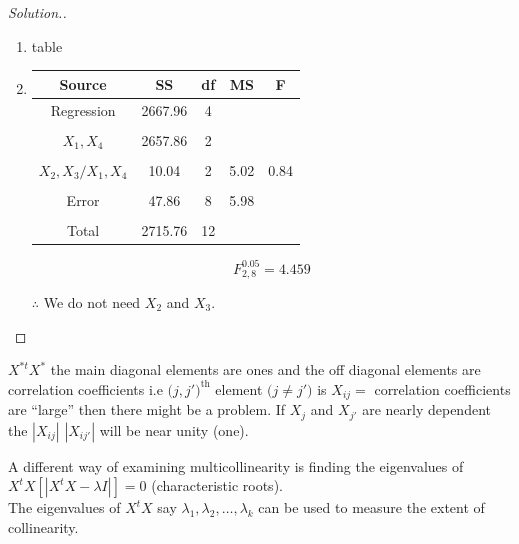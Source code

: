 \documentclass[11pt,a4paper]{article}
\theoremstyle{definition}
\newenvironment{solution}
  {\renewcommand{\qedsymbol}{}\begin{proof}[\textit{Solution}.]}
  {\end{proof}}
\begin{document}
\begin{solution}
\begin{enumerate}
\begin{enumerate}
\begin{enumerate}
$$R^2_a=1-\frac{\text{MSE}}{\text{MST}}=1-\frac{5.79}{226.3}=0.974$$\\

       \item table\\
       
       
       \item\quad 
\begin{table}[H]
\centering
\begin{tabular}{|c|c|c|c|c|}
\hline
Source & SS & df & MS & F\\
\hline
Regression & 2667.96 & 4 & &\\
&&&&\\
$X_1,X_4$ & 2657.86 & 2 & & \\
&&&&\\
$X_2,X_3/X_1,X_4$ & 10.04 & 2 & 5.02 & 0.84\\
&&&&\\
Error & 47.86 & 8 & 5.98 &\\
&&&&\\
Total & 2715.76 & 12 & &\\
\hline
\end{tabular}
\end{table}

$$F^{0.05}_{2,8}=4.459$$

$\therefore$ We do not need $X_2$ and $X_3$.\\
\end{enumerate}
\end{enumerate}
\end{enumerate}
\end{solution}


$X^{*t}X^*$ the main diagonal elements are  ones and the off diagonal elements are correlation coefficients i.e $\big(j,j'\big)^{\text{th}}$ element $\big(j\neq j'\big)$ is $X_{ij}=$ correlation coefficients  are ``large'' then there might be a problem. If $X_j$ and $X_{j'}$ are nearly dependent the $|X_{ij}|$ $|X_{ij'}|$ will be near unity (one).


A different way of examining multicollinearity is finding the eigenvalues of $X^tX[|X^tX-\lambda I|]=0$ (characteristic roots).\\

The eigenvalues of $X^tX$ say $\lambda_1,\lambda_2,\ldots ,\lambda_k$ can be used to measure the extent of collinearity.\\
\end{document}
